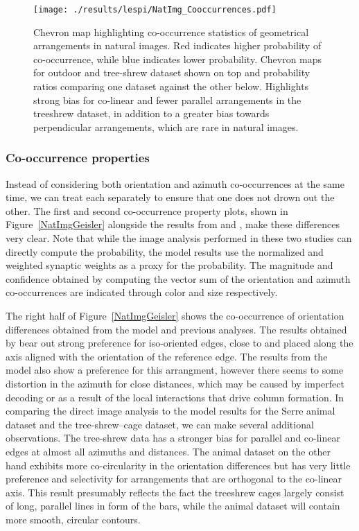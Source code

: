 \begin{figure}
	\centering
        \texttt{[image: ./results/lespi/NatImg\_Cooccurrences.pdf]}
	\caption[Chevron map highlighting co-occurrence statistics of
      geometrical arrangements in natural images.]{Chevron map
      highlighting co-occurrence statistics of geometrical
      arrangements in natural images. Red indicates higher probability
      of co-occurrence, while blue indicates lower
      probability. Chevron maps for outdoor and tree-shrew dataset
      shown on top and probability ratios comparing one dataset
      against the other below. Highlights strong bias for co-linear
      and fewer parallel arrangements in the treeshrew dataset, in
      addition to a greater bias towards perpendicular arrangements,
      which are rare in natural images. }
	\label{NatImgCooccurrences}
\end{figure}

\subsubsection*{Co-occurrence properties}

Instead of considering both orientation and azimuth co-occurrences at
the same time, we can treat each separately to ensure that one does
not drown out the other. The first and second co-occurrence property
plots, shown in Figure~\ref{NatImgGeisler} alongside the results from
\cite{Geisler2001} and \cite{Perrinet2015}, make these differences
very clear. Note that while the image analysis performed in these two
studies can directly compute the probability, the model results use
the normalized and weighted synaptic weights as a proxy for the
probability. The magnitude and confidence obtained by computing the
vector sum of the orientation and azimuth co-occurrences are indicated
through color and size respectively.

The right half of Figure~\ref{NatImgGeisler} shows the co-occurrence
of orientation differences obtained from the model and previous
analyses. The results obtained by \cite{Geisler2001} bear out strong
preference for iso-oriented edges, close to and placed along the axis
aligned with the orientation of the reference edge. The results from
the model also show a preference for this arrangment, however there
seems to some distortion in the azimuth for close distances, which may
be caused by imperfect decoding or as a result of the local
interactions that drive column formation. In comparing the direct
image analysis to the model results for the Serre animal dataset and
the tree-shrew--cage dataset, we can make several additional
observations. The tree-shrew data has a stronger bias for parallel and
co-linear edges at almost all azimuths and distances. The animal
dataset on the other hand exhibits more co-circularity in the
orientation differences but has very little preference and selectivity
for arrangements that are orthogonal to the co-linear axis. This
result presumably reflects the fact the treeshrew cages largely
consist of long, parallel lines in form of the bars, while the animal
dataset will contain more smooth, circular contours.

